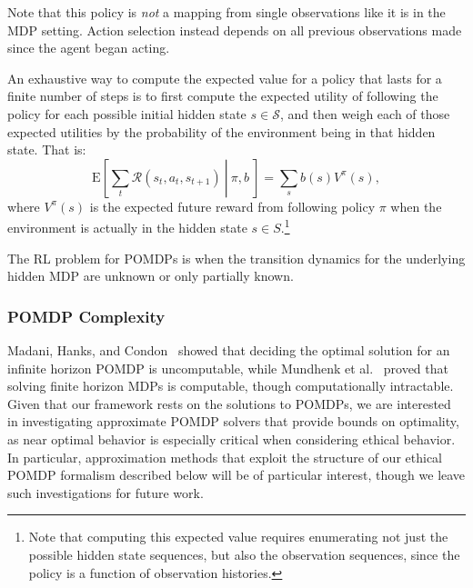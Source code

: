\documentclass[11pt]{article}
\newcommand\davenote[1]{\textcolor{blue}{Dave: #1}}
\begin{document}
Note that this policy is {\em not} a mapping from single observations like it is in the MDP setting. Action selection instead depends on all previous observations made since the agent began acting.

An exhaustive way to compute the expected value for a policy that lasts for a finite number of steps is to first compute the expected utility of following the policy for each possible initial hidden state $s \in \mathcal{S}$, and then weigh each of those expected utilities by the probability of the environment being in that hidden state. That is:
\begin{equation}
\left.\text{E}\left[\sum_t \mathcal{R}(s_t,a_t,s_{t+1})\ \right|\ \pi, b\ \right] = \sum_s b(s) V^\pi(s),
\end{equation}
where $V^\pi(s)$ is the expected future reward from following policy $\pi$ when the environment is actually in the hidden state $s \in S$.\footnote{Note that computing this expected value requires enumerating not just the possible hidden state sequences, but also the observation sequences, since the policy is a function of observation histories.}

The RL problem for POMDPs is when the transition dynamics for the underlying hidden MDP are unknown or only partially known.

\subsubsection{POMDP Complexity}
Madani, Hanks, and Condon~ showed that deciding the optimal solution for an infinite horizon POMDP is uncomputable, while Mundhenk et al.~ proved that solving finite horizon MDPs is computable, though computationally intractable. Given that our framework rests on the solutions to POMDPs, we are interested in investigating approximate POMDP solvers that provide bounds on optimality, as near optimal behavior is especially critical when considering ethical behavior. In particular, approximation methods that exploit the structure of our ethical POMDP formalism described below will be of particular interest, though we leave such investigations for future work.


\end{document}
